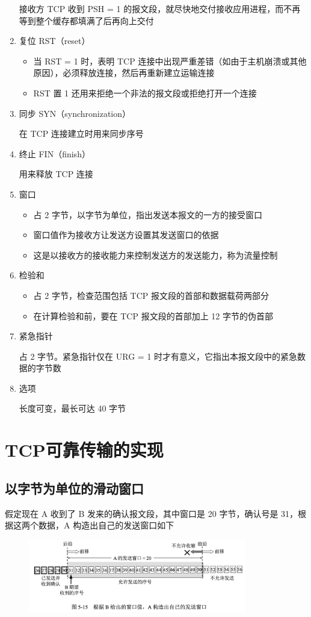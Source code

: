 \documentclass[cs4size,a4paper,10pt]{ctexart}
\begin{document}
\begin{enumerate}[label=\arabic*.]
		接收方 TCP 收到 PSH = 1 的报文段，就尽快地交付接收应用进程，而不再等到整个缓存都填满了后再向上交付
		\item 复位 RST（reset）
		\begin{itemize}
			\item 当 RST = 1 时，表明 TCP 连接中出现严重差错（如由于主机崩溃或其他原因），必须释放连接，然后再重新建立运输连接
			\item RST 置 1 还用来拒绝一个非法的报文段或拒绝打开一个连接
		\end{itemize}
		\item 同步 SYN（synchronization）
		
		在 TCP 连接建立时用来同步序号
		\item 终止 FIN（finish）
		
		用来释放 TCP 连接
		\item 窗口
		\begin{itemize}
			\item 占 2 字节，以字节为单位，指出发送本报文的一方的接受窗口
			\item 窗口值作为接收方让发送方设置其发送窗口的依据
			\item 这是以接收方的接收能力来控制发送方的发送能力，称为流量控制
		\end{itemize}
		\item 检验和
		\begin{itemize}
			\item 占 2 字节，检查范围包括 TCP 报文段的首部和数据载荷两部分
			\item 在计算检验和前，要在 TCP 报文段的首部加上 12 字节的伪首部
		\end{itemize}
		\item 紧急指针
		
		占 2 字节。紧急指针仅在 URG = 1 时才有意义，它指出本报文段中的紧急数据的字节数
		\item 选项
		
		长度可变，最长可达 40 字节
	\end{enumerate}

	\section{TCP可靠传输的实现}

	\subsection{以字节为单位的滑动窗口}

	假定现在 A 收到了 B 发来的确认报文段，其中窗口是 20 字节，确认号是 31，根据这两个数据，A 构造出自己的发送窗口如下
	\begin{figure}[H]
		\centering
		\includegraphics[width=0.85\textwidth]{img/5.15}
	\end{figure}
\end{document}
